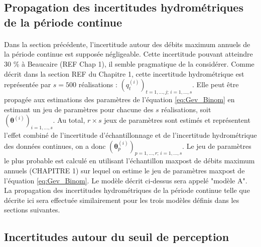 \documentclass[11pt]{article}
\begin{document}
	

	
	\subsection{Propagation des incertitudes hydrométriques de la période continue}
	
	\paragraph{}
	Dans la section précédente, l'incertitude autour des débits maximum annuels de la période continue est supposée négligeable. Cette incertitude pouvant atteindre 30 \% à Beaucaire (REF Chap 1), il semble pragmatique de la considérer. Comme décrit dans la section REF du Chapitre 1, cette incertitude hydrométrique est représentée par $s = 500$ réalisations : $(q_t^{(i)})_{t=1,...,j;\,i=1,...,s}$. Elle peut être propagée aux estimations des paramètres de l'équation \ref{eq:Gev_Binom} en estimant un jeu de paramètres pour chacune des $s$ réalisations, soit $(\boldsymbol{\theta}
	^{(i)})_{i=1,...,s}$. Au total, $r \times s$ jeux de paramètres sont estimés et représentent l'effet combiné de l'incertitude d'échantillonnage et de l'incertitude hydrométrique des données continues, on a donc $(\boldsymbol{\theta}^{(i)}_p)_{p=1,...,r;\, i=1,...,s}$. Le jeu de paramètres le plus probable est calculé en utilisant l'échantillon maxpost de débits maximum annuels (CHAPITRE 1) sur lequel on estime le jeu de paramètres maxpost de l'équation \ref{eq:Gev_Binom}. Le modèle décrit ci-dessus sera appelé "modèle A". La propagation des incertitudes hydrométriques de la période continue telle que décrite ici sera effectuée similairement pour les trois modèles définis dans les sections suivantes.
	
	\subsection{Incertitudes autour du seuil de perception}
	
\end{document}
